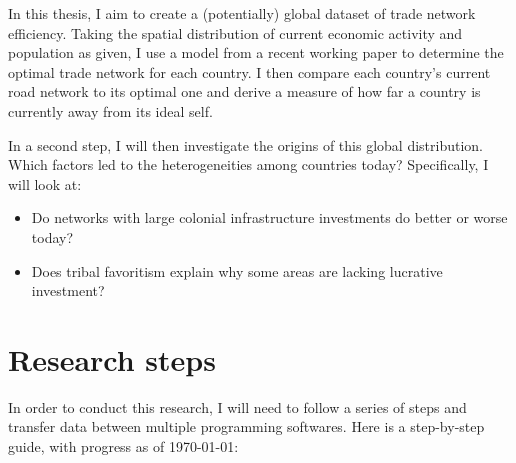 \documentclass[11pt, oneside]{article}   	%
\begin{document}
In this thesis, I aim to create a (potentially) global dataset of trade network efficiency. Taking the spatial distribution of current economic activity and population as given, I use a model from a recent working paper to determine the optimal trade network for each country. I then compare each country's current road network to its optimal one and derive a measure of how far a country is currently away from its ideal self.

In a second step, I will then investigate the origins of this global distribution. Which factors led to the heterogeneities among countries today? Specifically, I will look at:

\begin{itemize}
  \item Do networks with large colonial infrastructure investments do better or worse today?
  \item Does tribal favoritism explain why some areas are lacking lucrative investment?
\end{itemize}

\section{Research steps}

In order to conduct this research, I will need to follow a series of steps and transfer data between multiple programming softwares. Here is a step-by-step guide, with progress as of \today:
\end{document}
